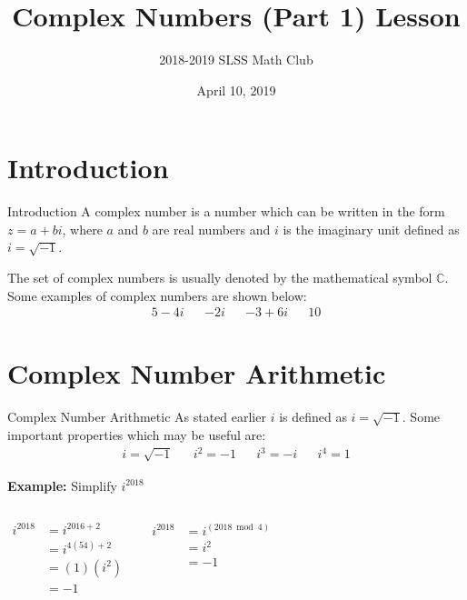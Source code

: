 \documentclass{beamer}
\title{Complex Numbers (Part 1) Lesson}
\author{2018-2019 SLSS Math Club}
\date{April 10, 2019}
\begin{document}
\frame{\titlepage}

\section{Introduction}
\begin{frame}{Introduction}
    A complex number is a number which can be written in the form $z=a + bi$, where $a$ and $b$ are real numbers and $i$ is the imaginary unit defined as $i = \sqrt{-1}$. \newline
    
    The set of complex numbers is usually denoted by the mathematical symbol $\mathbb{C}$. Some examples of complex numbers are shown below:
    \begin{align*}
        5 - 4i && -2i && -3 + 6i && 10
    \end{align*}
\end{frame}

\section{Complex Number Arithmetic}
\begin{frame}{Complex Number Arithmetic}
    As stated earlier $i$ is defined as $i = \sqrt{-1}$. Some important properties which may be useful are:
    \begin{align*}
        i = \sqrt{-1} && i^2 = -1 && i^3 = -i && i^4 = 1
    \end{align*}
    
    \textbf{Example:} Simplify $i^{2018}$
    \begin{columns}[T]
        \begin{align*}
            i^{2018} &= i^{2016 + 2} \\
                    &= i^{4(54) + 2} \\
                    &= (1)(i^2) \\
                    &= -1
        \end{align*}
    
        \begin{align*}
            i^{2018} &= i^{(2018 \bmod 4)} \\
                    &= i^{2} \\
                    &= -1
        \end{align*}
    \end{columns}
\end{frame}
\end{document}
